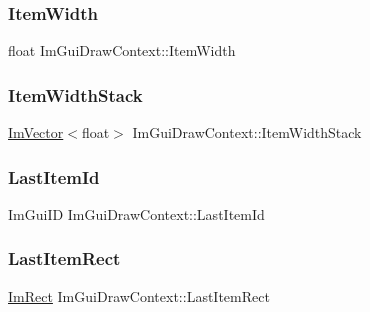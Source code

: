 \hypertarget{struct_im_gui_draw_context_a6327a65273ded49b6aa309167fca4b9e}{}\label{struct_im_gui_draw_context_a6327a65273ded49b6aa309167fca4b9e} 
\subsubsection{\texorpdfstring{Item\+Width}{ItemWidth}}
{\footnotesize\ttfamily float Im\+Gui\+Draw\+Context\+::\+Item\+Width}

\hypertarget{struct_im_gui_draw_context_af6420717337b44394ad7ccbe55446db2}{}\label{struct_im_gui_draw_context_af6420717337b44394ad7ccbe55446db2} 
\subsubsection{\texorpdfstring{Item\+Width\+Stack}{ItemWidthStack}}
{\footnotesize\ttfamily \hyperlink{class_im_vector}{Im\+Vector}$<$float$>$ Im\+Gui\+Draw\+Context\+::\+Item\+Width\+Stack}

\hypertarget{struct_im_gui_draw_context_ad864847097dd259ce9cb69558173fe45}{}\label{struct_im_gui_draw_context_ad864847097dd259ce9cb69558173fe45} 
\subsubsection{\texorpdfstring{Last\+Item\+Id}{LastItemId}}
{\footnotesize\ttfamily Im\+Gui\+ID Im\+Gui\+Draw\+Context\+::\+Last\+Item\+Id}

\hypertarget{struct_im_gui_draw_context_a214683a9c08e5812a492881791cd2f51}{}\label{struct_im_gui_draw_context_a214683a9c08e5812a492881791cd2f51} 
\subsubsection{\texorpdfstring{Last\+Item\+Rect}{LastItemRect}}
{\footnotesize\ttfamily \hyperlink{struct_im_rect}{Im\+Rect} Im\+Gui\+Draw\+Context\+::\+Last\+Item\+Rect}

